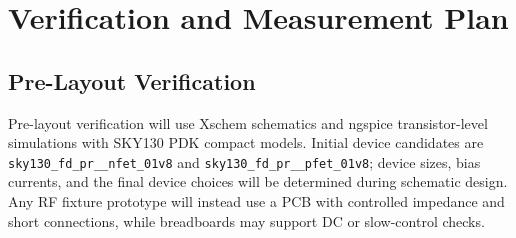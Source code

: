 
\section{Verification and Measurement Plan}
\subsection{Pre-Layout Verification}

Pre-layout verification will use Xschem schematics and ngspice transistor-level simulations with SKY130 PDK compact models.
Initial device candidates are \texttt{sky130\_fd\_pr\_\_nfet\_01v8} and \texttt{sky130\_fd\_pr\_\_pfet\_01v8}; device sizes, bias currents, and the final device choices will be determined during schematic design.
Any RF fixture prototype will instead use a PCB with controlled impedance and short connections, while breadboards may support DC or slow-control checks.

